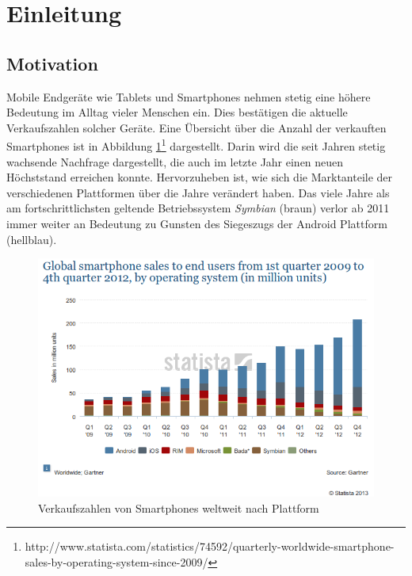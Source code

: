 \section{Einleitung}

\subsection{Motivation}

Mobile Endgeräte wie Tablets und Smartphones nehmen stetig eine höhere Bedeutung im Alltag vieler Menschen ein. Dies bestätigen die aktuelle Verkaufszahlen solcher Geräte. Eine Übersicht über die Anzahl der verkauften Smartphones ist in Abbildung \ref{sale1}\footnote{http://www.statista.com/statistics/74592/quarterly-worldwide-smartphone-sales-by-operating-system-since-2009/} dargestellt. Darin wird die seit Jahren stetig wachsende Nachfrage dargestellt, die auch im letzte Jahr einen neuen Höchststand erreichen konnte. Hervorzuheben ist, wie sich die Marktanteile der verschiedenen Plattformen über die Jahre verändert haben. Das viele Jahre als am fortschrittlichsten geltende Betriebssystem \emph{Symbian} (braun) verlor ab 2011 immer weiter an Bedeutung zu Gunsten des Siegeszugs der Android Plattform (hellblau).

\begin{figure}[h!t]
\begin{center}
\includegraphics[scale=0.6]{images/sale}
\caption{Verkaufszahlen von Smartphones weltweit nach Plattform}
\label{sale1}
\end{center}
\end{figure}

